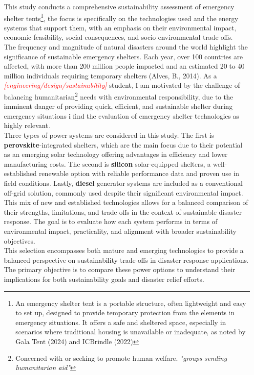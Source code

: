 \documentclass{article}
\begin{document}
This study conducts a comprehensive sustainability assessment of emergency shelter tents\footnote{An emergency shelter tent is a portable structure, often lightweight and easy to set up, designed to provide temporary protection from the elements in emergency situations. It offers a safe and sheltered space, especially in scenarios where traditional housing is unavailable or inadequate, as noted by Gala Tent (2024) and ICBrindle (2022)}, the focus is specifically on the technologies used and the energy systems that support them, with an emphasis on their environmental impact, economic feasibility, social consequences, and socio-environmental trade-offs.\\[8pt]	
The frequency and magnitude of natural disasters around the world highlight the significance of sustainable emergency shelters. Each year, over 100 countries are affected, with more than 200 million people impacted and an estimated 20 to 40 million individuals requiring temporary shelters (Alves, B., 2014). As a \textcolor{red}{\textit{[engineering/design/sustainability]}} student, I am motivated by the challenge of balancing humanitarian\footnote{Concerned with or seeking to promote human welfare. \textit{"groups sending humanitarian aid"}} needs with environmental responsibility, due to the imminent danger of providing quick, efficient, and sustainable shelter during emergency situations i find the evaluation of emergency shelter technologies as highly relevant.\\[8pt]
Three types of power systems are considered in this study. The first is \textbf{perovskite}-integrated shelters, which are the main focus due to their potential as an emerging solar technology offering advantages in efficiency and lower manufacturing costs. The second is \textbf{silicon} solar-equipped shelters, a well-established renewable option with reliable performance data and proven use in field conditions. Lastly, \textbf{diesel} generator systems are included as a conventional off-grid solution, commonly used despite their significant environmental impact.\\[8pt]
This mix of new and established technologies allows for a balanced comparison of their strengths, limitations, and trade-offs in the context of sustainable disaster response. The goal is to evaluate how each system performs in terms of environmental impact, practicality, and alignment with broader sustainability objectives.\\[8pt]
This selection encompasses both mature and emerging technologies to provide a balanced perspective on sustainability trade-offs in disaster response applications.\\[8pt]
The primary objective is to compare these power options to understand their implications for both sustainability goals and disaster relief efforts.
\end{document}
